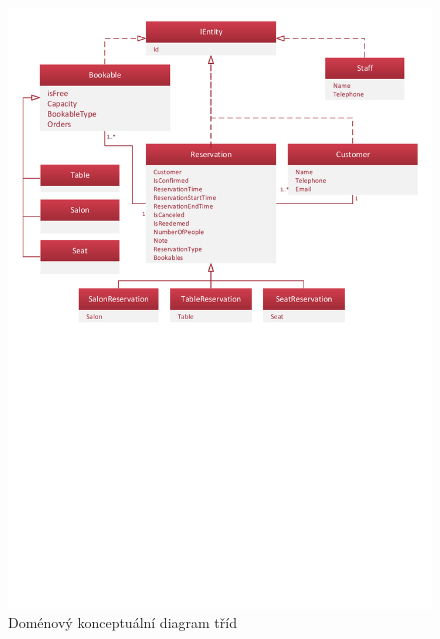 \newpage
\begin{figure}[h!]
\begin{center}
\includegraphics[scale=0.75]{../02_Vysledne_modely/05_1_ConceptualClassDiagram.pdf}
\vspace{-250pt}
\caption{Doménový konceptuální diagram tříd}
\label{fig:communication09-1}
\end{center}
\end{figure}





